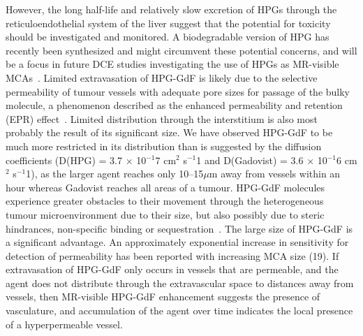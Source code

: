 However, the long half-life and relatively slow excretion of HPGs through the reticuloendothelial system of the liver suggest that the potential for toxicity should be investigated and monitored.
A biodegradable version of HPG has recently been synthesized and might circumvent these potential concerns, and will be a focus in future DCE studies investigating the use of HPGs as MR-visible MCAs~\cite{Shenoi:2013id}.
Limited extravasation of HPG-GdF is likely due to the selective permeability of tumour vessels with adequate pore sizes for passage of the bulky molecule, a phenomenon described as the enhanced permeability and retention (EPR) effect~\cite{Maeda:2013hq}.
Limited distribution through the interstitium is also most probably the result of its significant size.
We have observed HPG-GdF to be much more restricted in its distribution than is suggested by the diffusion coefficients (D(HPG) = 3.7 × 10$^{-1}$7 cm$^2$ s$^{-1}$1 and D(Gadovist) = 3.6 × 10$^{-1}$6 cm$^2$ s$^{-1}$1), as the larger agent reaches only 10–15$\mu$m away from vessels within an hour whereas Gadovist reaches all areas of a tumour.
HPG-GdF molecules experience greater obstacles to their movement through the heterogeneous tumour microenvironment due to their size, but also possibly due to steric hindrances, non-specific binding or sequestration~\cite{Minchinton:2006gs}.
The large size of HPG-GdF is a significant advantage.
An approximately exponential increase in sensitivity for detection of permeability has been reported with increasing MCA size (19).
If extravasation of HPG-GdF only occurs in vessels that are permeable, and the agent does not distribute through the extravascular space to distances away from vessels, then MR-visible HPG-GdF enhancement suggests the presence of vasculature, and accumulation of the agent over time indicates the local presence of a hyperpermeable vessel.

